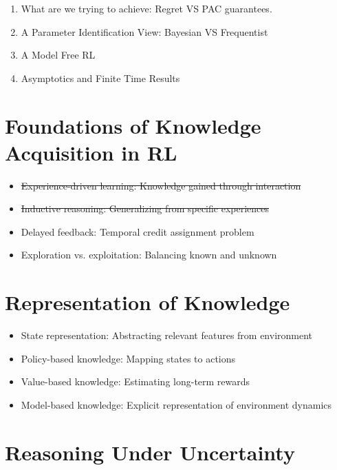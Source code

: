 \begin{enumerate}
    \item 
What are we trying to achieve: Regret VS PAC guarantees.
\item A Parameter Identification View:
Bayesian VS Frequentist 
\item A Model Free RL
\item Asymptotics and Finite Time Results
\end{enumerate}


\section{Foundations of Knowledge Acquisition in RL}
\begin{itemize}
    \item \sout{Experience-driven learning: Knowledge gained through interaction}
    \item \sout{Inductive reasoning: Generalizing from specific experiences}
    \item Delayed feedback: Temporal credit assignment problem
    \item Exploration vs. exploitation: Balancing known and unknown
\end{itemize}

\section{Representation of Knowledge}

\begin{itemize}
    \item State representation: Abstracting relevant features from environment
    \item Policy-based knowledge: Mapping states to actions
    \item Value-based knowledge: Estimating long-term rewards
    \item Model-based knowledge: Explicit representation of environment dynamics
\end{itemize}

\section{Reasoning Under Uncertainty}

